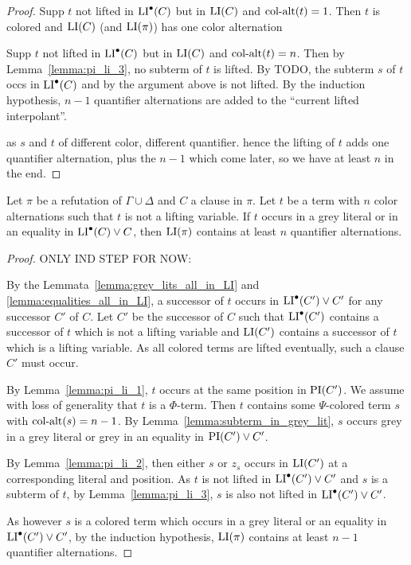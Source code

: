 \documentclass[,%
	draft=false,%
	numbers=noendperiod
	12pt,
	a4paper,
	oneside,%
	openany,
]{memoir}
\begin{document}
\begin{proof}
	Supp $t$ not lifted in $\operatorname{LI}^\bullet(C)$ but in $\operatorname{LI}(C)$ and $\operatorname{col-alt}(t) = 1$.
	Then $t$ is colored and $\operatorname{LI}(C)$ (and $\operatorname{LI}(\pi)$) has one color alternation

	Supp $t$ not lifted in $\operatorname{LI}^\bullet(C)$ but in $\operatorname{LI}(C)$ and $\operatorname{col-alt}(t) = n$.
	Then by Lemma~\ref{lemma:pi_li_3}, no subterm of $t$ is lifted.
	By TODO, the subterm $s$ of $t$ occs in $\operatorname{LI}^\bullet(C)$ and by the argument above is not lifted.
	By the induction hypothesis, $n-1$ quantifier alternations are added to the ``current lifted interpolant''.

	as $s$ and $t$ of different color, different quantifier.
	hence the lifting of $t$ adds one quantifier alternation, plus the $n-1$ which come later, so we have at least $n$ in the end.
\end{proof}

{
	\color{gray}
\begin{clemma}
	Let $\pi$ be a refutation of $\Gamma \cup \Delta$ and $C$ a clause in $\pi$.
	Let $t$ be a term with $n$ color alternations such that $t$ is not a lifting variable.
	If $t$ occurs in a grey literal or in an equality in $\operatorname{LI}^\bullet(C) \lor C$, then $\operatorname{LI}(\pi)$ contains at least $n$ quantifier alternations.
\end{clemma}
\begin{proof}
	ONLY IND STEP FOR NOW: 


	By the Lemmata~\ref{lemma:grey_lits_all_in_LI} and \ref{lemma:equalities_all_in_LI}, a successor of $t$ occurs in $\operatorname{LI}^\bullet(C') \lor C'$ for any successor $C'$ of $C$.
	Let $C'$ be the successor of $C$ such that $\operatorname{LI}^\bullet(C')$ contains a successor of $t$ which is not a lifting variable and $\operatorname{LI}(C')$ contains a successor of $t$ which is a lifting variable.
	As all colored terms are lifted eventually, such a clause $C'$ must occur.
	

	By Lemma~\ref{lemma:pi_li_1}, $t$ occurs at the same position in $\operatorname{PI}(C')$.
	We assume with loss of generality that $t$ is a $\Phi$-term.
	Then $t$ contains some $\Psi$-colored term $s$ with $\operatorname{col-alt}(s) = n-1$.
	By Lemma~\ref{lemma:subterm_in_grey_lit}, $s$ occurs grey in a grey literal or grey in an equality in $\operatorname{PI}(C')\lor C'$.

	By Lemma~\ref{lemma:pi_li_2}, then either $s$ or $z_s$ occurs in $\operatorname{LI}(C')$  at a corresponding literal and position. 
	As $t$ is not lifted in $\operatorname{LI}^\bullet(C') \lor C'$ and $s$ is a subterm of $t$, by Lemma~\ref{lemma:pi_li_3}, $s$ is also not lifted in $\operatorname{LI}^\bullet(C') \lor C'$.

	As however $s$ is a colored term which occurs in a grey literal or an equality in $\operatorname{LI}^\bullet(C') \lor C'$, by the induction hypothesis, $\operatorname{LI}(\pi)$ contains at least $n-1$ quantifier alternations. 

	
\end{proof}
}

\end{document}
